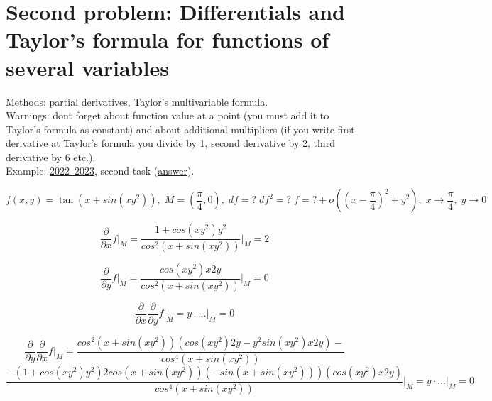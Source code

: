 \documentclass{article}
\begin{document}
\section{Second problem: Differentials and Taylor's formula for functions of several variables }
Methods: partial derivatives, Taylor's multivariable formula. \\
Warnings: dont forget about function value at a point (you must add it to Taylor's formula as constant) and about additional multipliers (if you write first derivative at Taylor's formula you divide by 1, second derivative by 2, third derivative by 6 etc.). \\
Example: \href{https://old.mipt.ru/education/chair/mathematics/exams/exams/2022-23/%D0%9C%D0%90%D0%98%D0%B8%D0%A0_%D0%92_23.pdf}{2022–2023}, second task (\href{https://old.mipt.ru/education/chair/mathematics/exams/exams/2022-23/%D0%9C%D0%90%D0%98%D0%B8%D0%A0_%D0%92_23%D0%BE%D1%82%D0%B2%D0%B5%D1%82%D1%8B.pdf}{answer}).

\begin{equation}
    f(x,y) = \tan (x+sin(xy^2)), \; M=(\frac{\pi}{4},0), \; df=? \; df^2=? \; f = ? + o((x-\frac{\pi}{4})^2+y^2), \; x \rightarrow \frac{\pi}{4}, \; y \rightarrow 0
\end{equation}

\begin{equation*}
    \frac{\partial}{\partial x} f \bigg|_M = \frac{1+cos(xy^2)y^2}{cos^2(x+sin(xy^2))} \bigg|_M = 2
\end{equation*}

\begin{equation*}
    \frac{\partial}{\partial y} f \bigg|_M = \frac{cos(xy^2)x2y}{cos^2(x+sin(xy^2))} \bigg|_M = 0 
\end{equation*}

\begin{equation*}
    \frac{\partial}{\partial x} \frac{\partial}{\partial y} f \bigg|_M = y \cdot ... \bigg|_M = 0
\end{equation*}

\begin{equation*}
    \frac{\partial}{\partial y} \frac{\partial}{\partial x} f \bigg|_M = \frac{cos^2(x+sin(xy^2))(cos(xy^2)2y-y^2sin(xy^2)x2y) - }{cos^4(x+sin(xy^2))}
\end{equation*}
\begin{equation*}
    \frac{ - (1+cos(xy^2)y^2)2cos(x+sin(xy^2))(-sin(x+sin(xy^2)))(cos(xy^2)x2y)}{cos^4(x+sin(xy^2))} \bigg|_M = y \cdot ... \bigg|_M = 0
\end{equation*}
\end{document}
